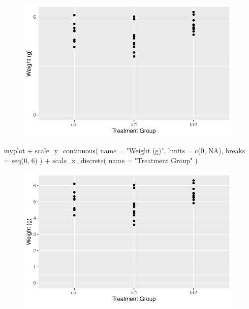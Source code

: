 \documentclass[
  letterpaper,
  DIV=11,
  numbers=noendperiod]{scrartcl}
\newenvironment{Shaded}{\begin{snugshade}}{\end{snugshade}}
\newcommand{\AttributeTok}[1]{\textcolor[rgb]{0.40,0.45,0.13}{#1}}
\newcommand{\ConstantTok}[1]{\textcolor[rgb]{0.56,0.35,0.01}{#1}}
\newcommand{\DecValTok}[1]{\textcolor[rgb]{0.68,0.00,0.00}{#1}}
\newcommand{\FunctionTok}[1]{\textcolor[rgb]{0.28,0.35,0.67}{#1}}
\newcommand{\NormalTok}[1]{\textcolor[rgb]{0.00,0.23,0.31}{#1}}
\newcommand{\SpecialCharTok}[1]{\textcolor[rgb]{0.37,0.37,0.37}{#1}}
\newcommand{\StringTok}[1]{\textcolor[rgb]{0.13,0.47,0.30}{#1}}
\begin{document}
\begin{figure}[H]

{\centering \includegraphics{ggplot2intro_files/figure-pdf/unnamed-chunk-10-1.pdf}

}

\end{figure}

\begin{Shaded}
\begin{Highlighting}[]
\NormalTok{myplot }\SpecialCharTok{+}
  \FunctionTok{scale\_y\_continuous}\NormalTok{(}
    \AttributeTok{name =} \StringTok{"Weight (g)"}\NormalTok{,}
    \AttributeTok{limits =} \FunctionTok{c}\NormalTok{(}\DecValTok{0}\NormalTok{, }\ConstantTok{NA}\NormalTok{),}
    \AttributeTok{breaks =} \FunctionTok{seq}\NormalTok{(}\DecValTok{0}\NormalTok{, }\DecValTok{6}\NormalTok{)}
\NormalTok{  ) }\SpecialCharTok{+}
  \FunctionTok{scale\_x\_discrete}\NormalTok{(}
    \AttributeTok{name =} \StringTok{"Treatment Group"}
\NormalTok{  )}
\end{Highlighting}
\end{Shaded}

\begin{figure}[H]

{\centering \includegraphics{ggplot2intro_files/figure-pdf/unnamed-chunk-11-1.pdf}

}

\end{figure}
\end{document}

